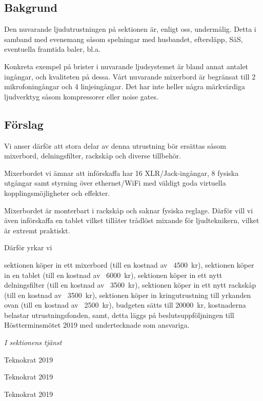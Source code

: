 \documentclass[../_main/handlingar.tex]{subfiles}
\begin{document}

\subsection*{Bakgrund}
    Den nuvarande ljudutrustningen på sektionen är, enligt oss, undermålig. Detta i samband med evenemang såsom spelningar med husbandet, eftersläpp, SåS, eventuella framtida baler, bl.a. 
    
    Konkreta exempel på brister i nuvarande ljudsystemet är bland annat antalet ingångar, och kvaliteten på dessa. Vårt nuvarande mixerbord är begränsat till 2 mikrofoningångar och 4 linjeingångar. Det har inte heller några märkvärdiga ljudverktyg såsom kompressorer eller noise gates. 

    \subsection*{Förslag}
    Vi anser därför att stora delar av denna utrustning bör ersättas såsom mixerbord, delningsfilter, rackskåp och diverse tillbehör. 



    Mixerbordet vi ämnar att införskaffa har 16 XLR/Jack-ingångar, 8 fysiska utgångar samt styrning över ethernet/WiFi med väldigt goda virtuella kopplingsmöjligheter och effekter. 

    Mixerbordet är monterbart i rackskåp och saknar fysiska reglage. Därför vill vi även införskaffa en tablet vilket tillåter trådlöst mixande för ljudteknikern, vilket är extremt praktiskt. 

Därför yrkar vi
    \begin{attsatser}
       \att sektionen köper in ett mixerbord (till en kostnad av ~\SI{4500}{kr}),
       \att sektionen köper in en tablet (till en kostnad av ~\SI{6000}{kr}),
       \att sektionen köper in ett nytt delningsfilter (till en kostnad av ~\SI{3500}{kr}),
       \att sektionen köper in ett nytt rackskåp (till en kostnad av ~\SI{3500}{kr}),
       \att sektionen köper in kringutrustning till yrkanden ovan (till en kostnad av ~\SI{2500}{kr}),
       \att budgeten sätts till \SI{20000}{kr},
       \att kostnaderna belastar utrustningsfonden, samt, 
       \att detta läggs på beslutsuppföljningen till Höstterminsmötet 2019 med undertecknade som ansvariga.
    \end{attsatser}
    


\begin{signatures}{3}
        \textit{I  sektionens tjänst}
        \signature{David Karlsson}{Teknokrat 2019}
        \signature{Emil P. Lundh}{Teknokrat 2019}
        \signature{Moa Rönnlund}{Teknokrat 2019}
    \end{signatures}
\end{document}
